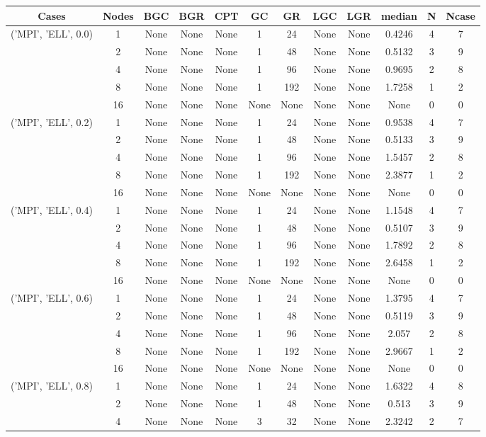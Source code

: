 \begin{tabular}{cccccccccccc}
\hline
Cases & Nodes& BGC& BGR& CPT& GC& GR& LGC& LGR& median & N & Ncase \\
\hline
\multirow{5}{*}{('MPI', 'ELL', 0.0)}& 1& None& None& None& 1& 24& None& None& 0.4246& 4& 7\\
& 2& None& None& None& 1& 48& None& None& 0.5132& 3& 9\\
& 4& None& None& None& 1& 96& None& None& 0.9695& 2& 8\\
& 8& None& None& None& 1& 192& None& None& 1.7258& 1& 2\\
& 16& None& None& None& None& None& None& None& None& 0& 0\\
\hline
\multirow{5}{*}{('MPI', 'ELL', 0.2)}& 1& None& None& None& 1& 24& None& None& 0.9538& 4& 7\\
& 2& None& None& None& 1& 48& None& None& 0.5133& 3& 9\\
& 4& None& None& None& 1& 96& None& None& 1.5457& 2& 8\\
& 8& None& None& None& 1& 192& None& None& 2.3877& 1& 2\\
& 16& None& None& None& None& None& None& None& None& 0& 0\\
\hline
\multirow{5}{*}{('MPI', 'ELL', 0.4)}& 1& None& None& None& 1& 24& None& None& 1.1548& 4& 7\\
& 2& None& None& None& 1& 48& None& None& 0.5107& 3& 9\\
& 4& None& None& None& 1& 96& None& None& 1.7892& 2& 8\\
& 8& None& None& None& 1& 192& None& None& 2.6458& 1& 2\\
& 16& None& None& None& None& None& None& None& None& 0& 0\\
\hline
\multirow{5}{*}{('MPI', 'ELL', 0.6)}& 1& None& None& None& 1& 24& None& None& 1.3795& 4& 7\\
& 2& None& None& None& 1& 48& None& None& 0.5119& 3& 9\\
& 4& None& None& None& 1& 96& None& None& 2.057& 2& 8\\
& 8& None& None& None& 1& 192& None& None& 2.9667& 1& 2\\
& 16& None& None& None& None& None& None& None& None& 0& 0\\
\hline
\multirow{5}{*}{('MPI', 'ELL', 0.8)}& 1& None& None& None& 1& 24& None& None& 1.6322& 4& 8\\
& 2& None& None& None& 1& 48& None& None& 0.513& 3& 9\\
& 4& None& None& None& 3& 32& None& None& 2.3242& 2& 7\\

\end{tabular}
